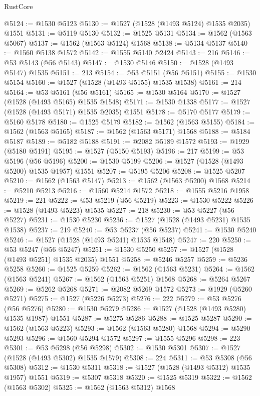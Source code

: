 \begin{lexlean}{RustCore}
\begin{coremodule}
@5124 := @1530 @5123
@5130 := @1527 (@1528 (@1493 @5124) @1535 @2035) @1551
@5131 := @5119 @5130
@5132 := @1525 @5131
@5134 := @1562 (@1563 @5067)
@5137 := @1562 (@1563 @5124) @1568
@5138 := @5134 @5137
@5140 := @1560 @5138 @1572
@5142 := @1555 @5140 @2424
@5143 := 216
@5146 := @53 @5143 (@56 @5143)
@5147 := @1530 @5146
@5150 := @1528 (@1493 @5147) @1535
@5151 := 213
@5154 := @53 @5151 (@56 @5151)
@5155 := @1530 @5154
@5160 := @1527 (@1528 (@1493 @5155) @1535 @1538)
@5161 := 214
@5164 := @53 @5161 (@56 @5161)
@5165 := @1530 @5164
@5170 := @1527 (@1528 (@1493 @5165) @1535 @1548)
@5171 := @1530 @1338
@5177 := @1527 (@1528 (@1493 @5171) @1535 @2035) @1551
@5178 := @5170 @5177
@5179 := @5160 @5178
@5180 := @1525 @5179
@5182 := @1562 (@1563 @5155)
@5184 := @1562 (@1563 @5165)
@5187 := @1562 (@1563 @5171) @1568
@5188 := @5184 @5187
@5189 := @5182 @5188
@5191 := @2082 @5189 @1572
@5193 := @1929 (@5180 @5191)
@5195 := @1527 (@5150 @5193)
@5196 := 217
@5199 := @53 @5196 (@56 @5196)
@5200 := @1530 @5199
@5206 := @1527 (@1528 (@1493 @5200) @1535 @1957) @1551
@5207 := @5195 @5206
@5208 := @1525 @5207
@5210 := @1562 (@1563 @5147)
@5213 := @1562 (@1563 @5200) @1568
@5214 := @5210 @5213
@5216 := @1560 @5214 @1572
@5218 := @1555 @5216 @1958
@5219 := 221
@5222 := @53 @5219 (@56 @5219)
@5223 := @1530 @5222
@5226 := @1528 (@1493 @5223) @1535
@5227 := 218
@5230 := @53 @5227 (@56 @5227)
@5231 := @1530 @5230
@5236 := @1527 (@1528 (@1493 @5231) @1535 @1538)
@5237 := 219
@5240 := @53 @5237 (@56 @5237)
@5241 := @1530 @5240
@5246 := @1527 (@1528 (@1493 @5241) @1535 @1548)
@5247 := 220
@5250 := @53 @5247 (@56 @5247)
@5251 := @1530 @5250
@5257 := @1527 (@1528 (@1493 @5251) @1535 @2035) @1551
@5258 := @5246 @5257
@5259 := @5236 @5258
@5260 := @1525 @5259
@5262 := @1562 (@1563 @5231)
@5264 := @1562 (@1563 @5241)
@5267 := @1562 (@1563 @5251) @1568
@5268 := @5264 @5267
@5269 := @5262 @5268
@5271 := @2082 @5269 @1572
@5273 := @1929 (@5260 @5271)
@5275 := @1527 (@5226 @5273)
@5276 := 222
@5279 := @53 @5276 (@56 @5276)
@5280 := @1530 @5279
@5286 := @1527 (@1528 (@1493 @5280) @1535 @1987) @1551
@5287 := @5275 @5286
@5288 := @1525 @5287
@5290 := @1562 (@1563 @5223)
@5293 := @1562 (@1563 @5280) @1568
@5294 := @5290 @5293
@5296 := @1560 @5294 @1572
@5297 := @1555 @5296
@5298 := 223
@5301 := @53 @5298 (@56 @5298)
@5302 := @1530 @5301
@5307 := @1527 (@1528 (@1493 @5302) @1535 @1579)
@5308 := 224
@5311 := @53 @5308 (@56 @5308)
@5312 := @1530 @5311
@5318 := @1527 (@1528 (@1493 @5312) @1535 @1957) @1551
@5319 := @5307 @5318
@5320 := @1525 @5319
@5322 := @1562 (@1563 @5302)
@5325 := @1562 (@1563 @5312) @1568

\end{coremodule}
\end{lexlean}
